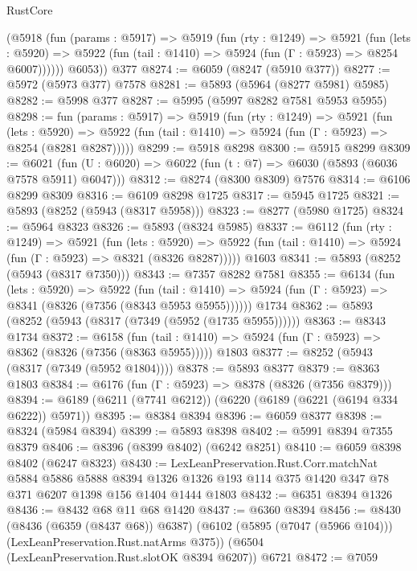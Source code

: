 \begin{lexlean}{RustCore}
\begin{coremodule}
        (@5918
          (fun (params : @5917) =>
          @5919
            (fun (rty : @1249) =>
            @5921
              (fun (lets : @5920) =>
              @5922 (fun (tail : @1410) => @5924 (fun (Γ : @5923) => @8254 @6007))))))
        @6053))
    @377
@8274 := @6059 (@8247 (@5910 @377))
@8277 := @5972 (@5973 @377) @7578
@8281 := @5893 (@5964 (@8277 @5981) @5985)
@8282 := @5998 @377
@8287 := @5995 (@5997 @8282 @7581 @5953 @5955)
@8298 := fun (params : @5917) =>
  @5919
    (fun (rty : @1249) =>
    @5921
      (fun (lets : @5920) =>
      @5922 (fun (tail : @1410) => @5924 (fun (Γ : @5923) => @8254 (@8281 @8287)))))
@8299 := @5918 @8298
@8300 := @5915 @8299
@8309 := @6021 (fun (U : @6020) => @6022 (fun (t : @7) => @6030 (@5893 (@6036 @7578 @5911) @6047)))
@8312 := @8274 (@8300 @8309) @7576
@8314 := @6106 @8299 @8309
@8316 := @6109 @8298 @1725
@8317 := @5945 @1725
@8321 := @5893 (@8252 (@5943 (@8317 @5958)))
@8323 := @8277 (@5980 @1725)
@8324 := @5964 @8323
@8326 := @5893 (@8324 @5985)
@8337 := @6112
    (fun (rty : @1249) =>
    @5921
      (fun (lets : @5920) =>
      @5922 (fun (tail : @1410) => @5924 (fun (Γ : @5923) => @8321 (@8326 @8287)))))
    @1603
@8341 := @5893 (@8252 (@5943 (@8317 @7350)))
@8343 := @7357 @8282 @7581
@8355 := @6134
    (fun (lets : @5920) =>
    @5922
      (fun (tail : @1410) => @5924 (fun (Γ : @5923) => @8341 (@8326 (@7356 (@8343 @5953 @5955))))))
    @1734
@8362 := @5893 (@8252 (@5943 (@8317 (@7349 (@5952 (@1735 @5955))))))
@8363 := @8343 @1734
@8372 := @6158
    (fun (tail : @1410) => @5924 (fun (Γ : @5923) => @8362 (@8326 (@7356 (@8363 @5955)))))
    @1803
@8377 := @8252 (@5943 (@8317 (@7349 (@5952 @1804))))
@8378 := @5893 @8377
@8379 := @8363 @1803
@8384 := @6176 (fun (Γ : @5923) => @8378 (@8326 (@7356 @8379)))
@8394 := @6189 (@6211 (@7741 @6212)) (@6220 (@6189 (@6221 (@6194 @334 @6222)) @5971))
@8395 := @8384 @8394
@8396 := @6059 @8377
@8398 := @8324 (@5984 @8394)
@8399 := @5893 @8398
@8402 := @5991 @8394 @7355 @8379
@8406 := @8396 (@8399 @8402) (@6242 @8251)
@8410 := @6059 @8398 @8402 (@6247 @8323)
@8430 := LexLeanPreservation.Rust.Corr.matchNat
    @5884
    @5886
    @5888
    @8394
    @1326
    @1326
    @193
    @114
    @375
    @1420
    @347
    @78
    @371
    @6207
    @1398
    @156
    @1404
    @1444
    @1803
@8432 := @6351 @8394 @1326
@8436 := @8432 @68 @11 @68 @1420
@8437 := @6360 @8394
@8456 := @8430
    (@8436 (@6359 (@8437 @68)) @6387)
    (@6102 (@5895 (@7047 (@5966 @104))) (LexLeanPreservation.Rust.natArms @375))
    (@6504 (LexLeanPreservation.Rust.slotOK @8394 @6207))
    @6721
@8472 := @7059

\end{coremodule}
\end{lexlean}
